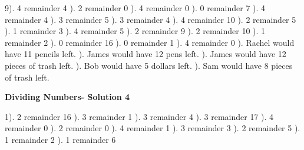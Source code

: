 \documentclass{article}%
\begin{document}
9). 4 remainder 4%
). 2 remainder 0%
). 4 remainder 0%
). 0 remainder 7%
). 4 remainder 4%
). 3 remainder 5%
). 3 remainder 4%
). 4 remainder 10%
). 2 remainder 5%
). 1 remainder 3%
). 4 remainder 5%
). 2 remainder 9%
). 2 remainder 10%
). 1 remainder 2%
). 0 remainder 16%
). 0 remainder 1%
). 4 remainder 0%
). Rachel would have 11 pencils left.%
). James would have 12 pens left.%
). James would have 12 pieces of trash left.%
). Bob would have 5 dollars left.%
). Sam would have 8 pieces of trash left.%
\newline%
\newpage%
\large%
\begin{center}%
\textbf{Dividing Numbers- Solution 4}%
\newline%
\end{center} \normalsize%
1). 2 remainder 16%
). 3 remainder 1%
). 3 remainder 4%
). 3 remainder 17%
). 4 remainder 0%
). 2 remainder 0%
). 4 remainder 1%
). 3 remainder 3%
). 2 remainder 5%
). 1 remainder 2%
). 1 remainder 6%
\newline%
\end{document}
